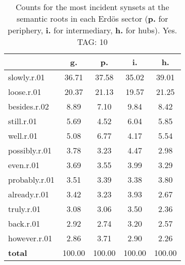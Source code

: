 \begin{table}[h!]
\begin{center}
\begin{tabular}{| l || c | c | c | c |}\hline
 & {\bf g.} & {\bf p.} & {\bf i.} & {\bf h.} \\\hline\hline
slowly.r.01 & 36.71  & 37.58  & 35.02  & 39.01 \\\hline
loose.r.01 & 20.37  & 21.13  & 19.57  & 21.25 \\\hline
besides.r.02 & 8.89  & 7.10  & 9.84  & 8.42 \\\hline
still.r.01 & 5.69  & 4.52  & 6.04  & 5.85 \\\hline
well.r.01 & 5.08  & 6.77  & 4.17  & 5.54 \\\hline
possibly.r.01 & 3.78  & 3.23  & 4.47  & 2.98 \\\hline
even.r.01 & 3.69  & 3.55  & 3.99  & 3.29 \\\hline
probably.r.01 & 3.51  & 3.39  & 3.38  & 3.80 \\\hline
already.r.01 & 3.42  & 3.23  & 3.93  & 2.67 \\\hline
truly.r.01 & 3.08  & 3.06  & 3.50  & 2.36 \\\hline
back.r.01 & 2.92  & 2.74  & 3.20  & 2.57 \\\hline
however.r.01 & 2.86  & 3.71  & 2.90  & 2.26 \\\hline\hline
{{\bf total}} & 100.00  & 100.00  & 100.00  & 100.00 \\\hline
\end{tabular}
\caption{Counts for the most incident synsets at the semantic roots in each Erd\"os sector ({\bf p.} for periphery, {\bf i.} for intermediary, {\bf h.} for hubs). Yes. TAG: 10}
\end{center}
\end{table}